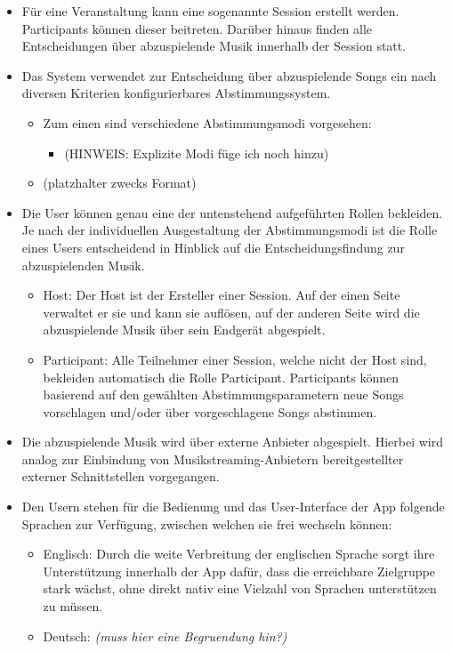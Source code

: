 \documentclass[oneside, ngerman]{sdqtechreport}
\begin{document}
\begin{itemize}
\begin{itemize}
        \end{itemize}
    \item     Für eine Veranstaltung kann eine sogenannte Session erstellt werden. Participants können dieser beitreten. Darüber hinaus finden alle Entscheidungen über abzuspielende Musik innerhalb der Session statt.
    \item Das System verwendet zur Entscheidung über abzuspielende Songs ein nach diversen Kriterien konfigurierbares Abstimmungssystem.
    \begin{itemize}
        \item Zum einen sind verschiedene Abstimmungsmodi vorgesehen:
        \begin{itemize}
            \item (HINWEIS: Explizite Modi füge ich noch hinzu)
        \end{itemize}
        \item  (platzhalter zwecks Format)
    \end{itemize}
    \item Die User können genau eine der untenstehend aufgeführten Rollen bekleiden. Je nach der individuellen Ausgestaltung der Abstimmungsmodi ist die Rolle eines Users entscheidend in Hinblick auf die Entscheidungsfindung zur abzuspielenden Musik.
    \begin{itemize}
        \item Host: Der Host ist der Ersteller einer Session. Auf der einen Seite verwaltet er sie und kann sie auflösen, auf der anderen Seite wird die abzuspielende Musik über sein Endgerät abgespielt.
        \item Participant: Alle Teilnehmer einer Session, welche nicht der Host sind, bekleiden automatisch die Rolle Participant. Participants können basierend auf den gewählten Abstimmungsparametern neue Songs vorschlagen und/oder über vorgeschlagene Songs abstimmen. 
    \end{itemize}
    \item Die abzuspielende Musik wird über externe Anbieter abgespielt. Hierbei wird analog zur Einbindung von Musikstreaming-Anbietern bereitgestellter externer Schnittstellen vorgegangen.
    \item  Den Usern stehen für die Bedienung und das User-Interface der App folgende Sprachen zur Verfügung, zwischen welchen sie frei wechseln können:
    \begin{itemize}
        \item Englisch: Durch die weite Verbreitung der englischen Sprache sorgt ihre Unterstützung innerhalb der App dafür, dass die erreichbare Zielgruppe stark wächst, ohne direkt nativ eine Vielzahl von Sprachen unterstützen zu müssen.
        \item Deutsch: \textit{(\rightarrow muss hier eine Begruendung hin?)}
    \end{itemize}
    
    \end{itemize}
\end{document}
